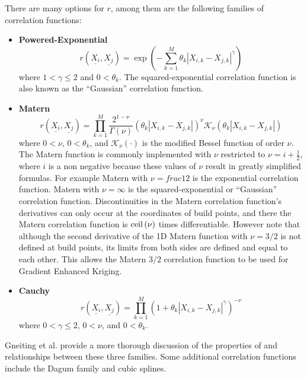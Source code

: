 \documentclass{article}
\begin{document}
There are many options for $r$, among them are the following 
families of correlation functions:
\begin{itemize}
\item {\bf Powered-Exponential}
      \begin{equation}
        r\left(\underline{X_i},\underline{X_j}\right)=\exp\left(-\sum_{k=1}^M \theta_k\left|X_{i,k}-X_{j,k}\right|^\gamma\right)
        \label{Eqn:PowExpCorrFunc}
      \end{equation}
      where $1<\gamma\le2$ and $0<\theta_k$.  The squared-exponential
      correlation function is also known as the ``Gaussian'' correlation 
      function.
\item {\bf Matern}
      \begin{displaymath}
        r\left(\underline{X_i},\underline{X_j}\right)=\prod_{k=1}^M \frac{2^{1-\nu}}{\Gamma(\nu)}\left(\theta_k\left|X_{i,k}-X_{j,k}\right|\right)^\nu\mathcal{K}_\nu\left(\theta_k\left|X_{i,k}-X_{j,k}\right|\right)
      \end{displaymath}
      where $0<\nu$, $0<\theta_k$, and $\mathcal{K}_\nu(\cdot)$ is the 
      modified Bessel function of order $\nu$. The Matern function is 
      commonly implemented with $\nu$ restricted to $\nu=i+\frac{1}{2}$, 
      where $i$ is a non negative because these values of $\nu$ result 
      in greatly simplified formulas.  For example Matern with $\nu=frac{1}{2}$
      is the exponential correlation function.  Matern with $\nu=\infty$
      is the squared-exponential or ``Gaussian'' correlation function.
      Discontinuities in the Matern correlation function's derivatives can
      only occur at the coordinates of build points, and there the 
      Matern correlation function is ${\rm ceil}\left(\nu\right)$ 
      times differentiable.  However note that although the second derivative 
      of the 1D Matern function with $\nu=3/2$ is not defined at build points, 
      its limits from both sides are defined and equal to each other.  This
      allows the Matern $3/2$ correlation function to be used for Gradient 
      Enhanced Kriging.
\item {\bf Cauchy}
      \begin{displaymath}
        r\left(\underline{X_i},\underline{X_j}\right)=\prod_{k=1}^M \left(1+\theta_k\left|X_{i,k}-X_{j,k}\right|^\gamma\right)^{-\nu}
      \end{displaymath}
      where $0<\gamma\le2$, $0<\nu$, and $0<\theta_k$.
\end{itemize}
Gneiting et al. \cite{gneiting2007geostatistical} provide a more 
thorough discussion of the properties of and relationships between these
three families.  Some additional correlation functions include the 
Dagum family \cite{berg2008dagum} and cubic splines.\newline
\end{document}

